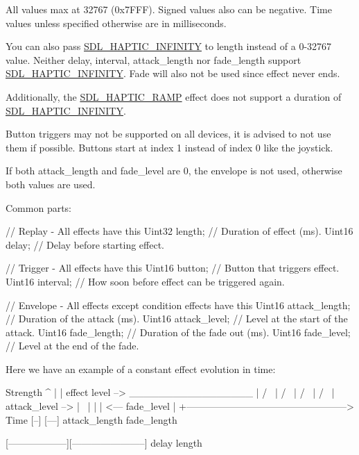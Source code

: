 All values max at 32767 (0x7\+F\+FF). Signed values also can be negative. Time values unless specified otherwise are in milliseconds.

You can also pass \mbox{\hyperlink{_s_d_l__haptic_8h_a648896e9e14cb27fa8a4b6632d3f3882}{S\+D\+L\+\_\+\+H\+A\+P\+T\+I\+C\+\_\+\+I\+N\+F\+I\+N\+I\+TY}} to length instead of a 0-\/32767 value. Neither delay, interval, attack\+\_\+length nor fade\+\_\+length support \mbox{\hyperlink{_s_d_l__haptic_8h_a648896e9e14cb27fa8a4b6632d3f3882}{S\+D\+L\+\_\+\+H\+A\+P\+T\+I\+C\+\_\+\+I\+N\+F\+I\+N\+I\+TY}}. Fade will also not be used since effect never ends.

Additionally, the \mbox{\hyperlink{_s_d_l__haptic_8h_af10eb937a64a8f602e9c46682ac0d868}{S\+D\+L\+\_\+\+H\+A\+P\+T\+I\+C\+\_\+\+R\+A\+MP}} effect does not support a duration of \mbox{\hyperlink{_s_d_l__haptic_8h_a648896e9e14cb27fa8a4b6632d3f3882}{S\+D\+L\+\_\+\+H\+A\+P\+T\+I\+C\+\_\+\+I\+N\+F\+I\+N\+I\+TY}}.

Button triggers may not be supported on all devices, it is advised to not use them if possible. Buttons start at index 1 instead of index 0 like the joystick.

If both attack\+\_\+length and fade\+\_\+level are 0, the envelope is not used, otherwise both values are used.

Common parts\+: 
\begin{DoxyCode}
\textcolor{comment}{// Replay - All effects have this}
Uint32 length;        \textcolor{comment}{// Duration of effect (ms).}
Uint16 delay;         \textcolor{comment}{// Delay before starting effect.}

\textcolor{comment}{// Trigger - All effects have this}
Uint16 button;        \textcolor{comment}{// Button that triggers effect.}
Uint16 interval;      \textcolor{comment}{// How soon before effect can be triggered again.}

\textcolor{comment}{// Envelope - All effects except condition effects have this}
Uint16 attack\_length; \textcolor{comment}{// Duration of the attack (ms).}
Uint16 attack\_level;  \textcolor{comment}{// Level at the start of the attack.}
Uint16 fade\_length;   \textcolor{comment}{// Duration of the fade out (ms).}
Uint16 fade\_level;    \textcolor{comment}{// Level at the end of the fade.}
\end{DoxyCode}


Here we have an example of a constant effect evolution in time\+: \begin{DoxyVerb}Strength
^
|
|    effect level -->  _________________
|                     /                 \
|                    /                   \
|                   /                     \
|                  /                       \
| attack_level --> |                        \
|                  |                        |  <---  fade_level
|
+--------------------------------------------------> Time
                   [--]                 [---]
                   attack_length        fade_length

[------------------][-----------------------]
delay               length
\end{DoxyVerb}


